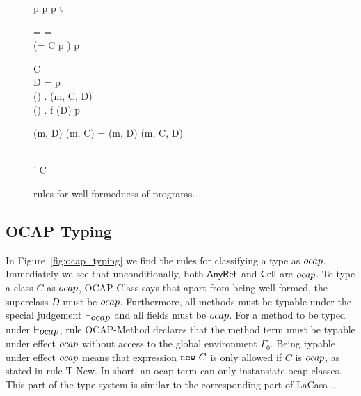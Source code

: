 \begin{figure}[h]
  {p \vdash {} \andalso p \vdash {} \andalso
  }
  {p \vdash {} \:  \: t}

  \RuleSpace{}

  {\sigma = \LatType \lor \sigma = \CellType ~ \lor  \\
  (\sigma = C \land p \vdash {})}
  {p \vdash {}}
  
  \RuleSpace{}

  {C \vdash {} \\ D = \AnyRefType{} \lor
  p \vdash {} \\
  \forall () \in {} . \: \override(m,
  C, D) \\
  \forall () \in {} . \: f \notin \fields(D) }
  {p \vdash {}}

  \RuleSpace{}

  {\mtype(m, D) \lor \mtype(m, C) = \mtype(m, D)}
  {\override(m, C, D)}
  
  \RuleSpace{}

  {  \\
  \tau' \stof \tau}
  {C \vdash {}}
  \caption{\RACL{} rules for well formedness of programs.}
  \label{fig:wf_typing}
\end{figure}

\subsection{OCAP Typing}%
\label{sub:ocap_typing}

In Figure~\ref{fig:ocap_typing} we find the rules for classifying a type as $\mbox{$ocap$}$.
Immediately we see that unconditionally, both $\mbox{$\mathsf{AnyRef}$}$ and $\mbox{$\mathsf{Cell}$}$ are
$\mbox{$ocap$}$. To type a class $C$ as $\mbox{$ocap$}$, {\sc OCAP-Class} says that apart from being
well formed, the superclass $D$ must be $\mbox{$ocap$}$. Furthermore, all methods must
be typable under the special judgement $\vdash_{\mbox{$ocap$}}$ and all fields must be
$\mbox{$ocap$}$.  For a method to be typed under $\vdash_{\mbox{$ocap$}}$, rule {\sc
OCAP-Method} declares that the method term must be typable under effect $\mbox{$ocap$}$
without access to the global environment $\Gamma_0$. Being typable under effect
$\mbox{$ocap$}$ means that expression $\mbox{\mdseries\texttt{new}~$C$}$ is only allowed if $C$ is $\mbox{$ocap$}$, as
stated in rule {\sc T-New}. In short, an ocap term can only instansiate ocap
classes. This part of the type system is similar to the corresponding part of
LaCasa~\parencite{conf/oopsla/HallerL16}.

